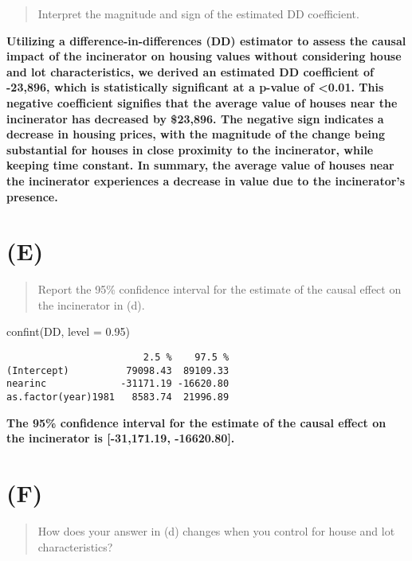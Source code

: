 \documentclass[
  letterpaper,
  DIV=11,
  numbers=noendperiod]{scrartcl}
\newenvironment{Shaded}{\begin{snugshade}}{\end{snugshade}}
\newcommand{\AttributeTok}[1]{\textcolor[rgb]{0.40,0.45,0.13}{#1}}
\newcommand{\FloatTok}[1]{\textcolor[rgb]{0.68,0.00,0.00}{#1}}
\newcommand{\FunctionTok}[1]{\textcolor[rgb]{0.28,0.35,0.67}{#1}}
\newcommand{\NormalTok}[1]{\textcolor[rgb]{0.00,0.23,0.31}{#1}}
\begin{document}
\begin{quote}
Interpret the magnitude and sign of the estimated DD coefficient.
\end{quote}

\textbf{Utilizing a difference-in-differences (DD) estimator to assess
the causal impact of the incinerator on housing values without
considering house and lot characteristics, we derived an estimated DD
coefficient of -23,896, which is statistically significant at a p-value
of \textless0.01. This negative coefficient signifies that the average
value of houses near the incinerator has decreased by \$23,896. The
negative sign indicates a decrease in housing prices, with the magnitude
of the change being substantial for houses in close proximity to the
incinerator, while keeping time constant. In summary, the average value
of houses near the incinerator experiences a decrease in value due to
the incinerator's presence.}

\hypertarget{e}{%
\section{(E)}\label{e}}

\begin{quote}
Report the 95\% confidence interval for the estimate of the causal
effect on the incinerator in (d).
\end{quote}

\begin{Shaded}
\begin{Highlighting}[]
\FunctionTok{confint}\NormalTok{(DD, }\AttributeTok{level =} \FloatTok{0.95}\NormalTok{)}
\end{Highlighting}
\end{Shaded}

\begin{verbatim}
                        2.5 %    97.5 %
(Intercept)          79098.43  89109.33
nearinc             -31171.19 -16620.80
as.factor(year)1981   8583.74  21996.89
\end{verbatim}

\textbf{The 95\% confidence interval for the estimate of the causal
effect on the incinerator is {[}-31,171.19, -16620.80{]}.}

\hypertarget{f}{%
\section{(F)}\label{f}}

\begin{quote}
How does your answer in (d) changes when you control for house and lot
characteristics?
\end{quote}
\end{document}
